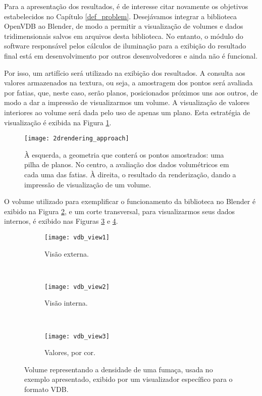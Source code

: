 
Para a apresentação dos resultados, é de interesse citar novamente os objetivos estabelecidos no Capítulo \ref{def_problem}. Desejávamos integrar a biblioteca OpenVDB ao Blender, de modo a permitir a visualização de volumes e dados tridimensionais salvos em arquivos desta biblioteca. No entanto, o módulo do software responsável pelos cálculos de iluminação para a exibição do resultado final está em desenvolvimento por outros desenvolvedores e ainda não é funcional.

Por isso, um artifício será utilizado na exibição dos resultados. A consulta aos valores armazenados na textura, ou seja, a amostragem dos pontos será avaliada por fatias, que, neste caso, serão planos, posicionados próximos uns aos outros, de modo a dar a impressão de visualizarmos um volume. A visualização de valores interiores ao volume será dada pelo uso de apenas um plano. Esta estratégia de visualização é exibida na Figura \ref{render_approach}.

\begin{figure}[!htb]
\center
\texttt{[image: 2drendering\_approach]}
\caption{À esquerda, a geometria que conterá os pontos amostrados: uma pilha de planos. No centro, a avaliação dos dados volumétricos em cada uma das fatias. À direita, o resultado da renderização, dando a impressão de visualização de um volume.}
\label{render_approach}
\end{figure}

O volume utilizado para exemplificar o funcionamento da biblioteca no Blender é exibido na Figura \ref{fig:vdb_view1}, e um corte transversal, para visualizarmos seus dados internos, é exibido nas Figuras \ref{fig:vdb_view2} e \ref{fig:vdb_view3}.

\begin{figure}[H]
        \centering
        \begin{subfigure}{0.3\textwidth}
                \texttt{[image: vdb\_view1]}
                \caption{Visão externa.}
                \label{fig:vdb_view1}
        \end{subfigure}%
        ~ %
        \begin{subfigure}{0.3\textwidth}
                \texttt{[image: vdb\_view2]}
                \caption{Visão interna.}
                \label{fig:vdb_view2}
        \end{subfigure}
        ~ %
        \begin{subfigure}{0.3\textwidth}
                \texttt{[image: vdb\_view3]}
                \caption{Valores, por cor.}
                \label{fig:vdb_view3}
        \end{subfigure}
        \caption{Volume representando a densidade de uma fumaça, usada no exemplo apresentado, exibido por um visualizador específico para o formato VDB.}\label{fig:vdb_view}
\end{figure}


